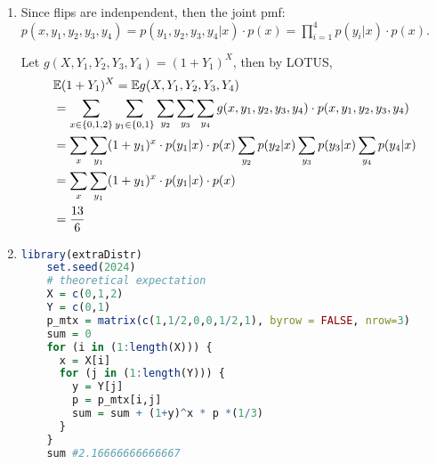 \documentclass{article}
\begin{document}



\begin{enumerate}
  
  \item 
  Since flips are indenpendent, then the joint pmf: $p(x, y_1, y_2, y_3, y_4) = p(y_1, y_2, y_3, y_4 |x) \cdot p(x) = \prod_{i=1}^4 p(y_i | x) \cdot p(x)$.

  Let $g(X, Y_1, Y_2, Y_3, Y_4) = (1 + Y_1)^X$, then by LOTUS, 
  \begin{align*}
    & \mathbb{E} (1 + Y_1)^X = \mathbb{E} g(X, Y_1, Y_2, Y_3, Y_4) \\
    & = \sum_{x \in \{0,1,2\}} \sum_{y_1\in \{0,1\}} \sum_{y_2} \sum_{y_3} \sum _{y_4} g(x, y_1, y_2, y_3, y_4) \cdot p(x, y_1, y_2, y_3, y_4)\\
    & = \sum_{x}\sum_{y_1} (1+y_1)^x \cdot p(y_1|x)\cdot p(x) \sum_{y_2} p(y_2|x) \sum_{y_3} p(y_3|x) \sum_{y_4} p(y_4|x)\\
    & = \sum_{x}\sum_{y_1} (1+y_1)^x \cdot p(y_1|x)\cdot p(x)\\
    & = \frac{13}{6}
  \end{align*}

  \item 
  \begin{lstlisting}[language=R]
    library(extraDistr)
    set.seed(2024)
    # theoretical expectation
    X = c(0,1,2)
    Y = c(0,1)
    p_mtx = matrix(c(1,1/2,0,0,1/2,1), byrow = FALSE, nrow=3)
    sum = 0
    for (i in (1:length(X))) {
      x = X[i]
      for (j in (1:length(Y))) {
        y = Y[j]
        p = p_mtx[i,j]
        sum = sum + (1+y)^x * p *(1/3)
      }
    }
    sum #2.16666666666667


\end{lstlisting}
\end{enumerate}
\end{document}
